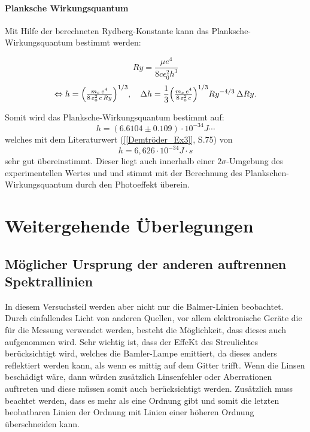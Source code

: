 \paragraph{Planksche Wirkungsquantum}

Mit Hilfe der berechneten Rydberg-Konstante kann das Planksche-Wirkungsquantum bestimmt werden:

\begin{equation}
    Ry = \frac{\mu e^4}{8 c \epsilon_0^2h^3}
\end{equation}
\begin{equation}
  \Leftrightarrow h
  = \Bigl(\tfrac{m_e\,e^{4}}{8\,\varepsilon_{0}^{2}\,c\,Ry}\Bigr)^{1/3},
  \quad
  \Delta h
  = \frac{1}{3}
    \Bigl(\tfrac{m_e\,e^{4}}{8\,\varepsilon_{0}^{2}\,c}\Bigr)^{1/3}
    Ry^{-4/3}\,\Delta Ry.
\end{equation}

Somit wird das Planksche-Wirkungsquantum bestimmt auf:
\begin{equation}
    h = (6.6104 \pm 0.109)\cdot 10^{-34} J\cdots
\end{equation}
welches mit dem Literaturwert (\cref{[Demtröder_Ex3]}, S.75) von
\begin{equation}
    h = 6,626 \cdot10^{-34} J\cdot s
\end{equation}
sehr gut übereinstimmt.
Dieser liegt auch innerhalb einer $2\sigma$-Umgebung des experimentellen Wertes und und stimmt mit der Berechnung des Plankschen-Wirkungsquantum durch den Photoeffekt überein.


\section{Weitergehende Überlegungen}
\subsection{Möglicher Ursprung der anderen auftrennen Spektrallinien}
In diesem Versuchsteil werden aber nicht nur die Balmer-Linien beobachtet. 
Durch einfallendes Licht von anderen Quellen, vor allem elektronische Geräte die für die Messung verwendet werden, besteht die Möglichkeit, dass dieses auch aufgenommen wird.
Sehr wichtig ist, dass der EffeKt des Streulichtes berücksichtigt wird, welches die Bamler-Lampe emittiert, da dieses anders reflektiert werden kann, als wenn es mittig auf dem Gitter trifft.
Wenn die Linsen beschädigt wäre, dann würden zusätzlich Linsenfehler oder Aberrationen auftreten und diese müssen somit auch berücksichtigt werden. 
Zusätzlich muss beachtet werden, dass es mehr als eine Ordnung gibt und somit die letzten beobatbaren Linien der Ordnung mit Linien einer höheren Ordnung überschneiden kann.

